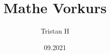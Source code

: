 



\title{Mathe Vorkurs}
\author{Tristan H}
\date{09.2021}
\maketitle

\tableofcontents
\newpage







